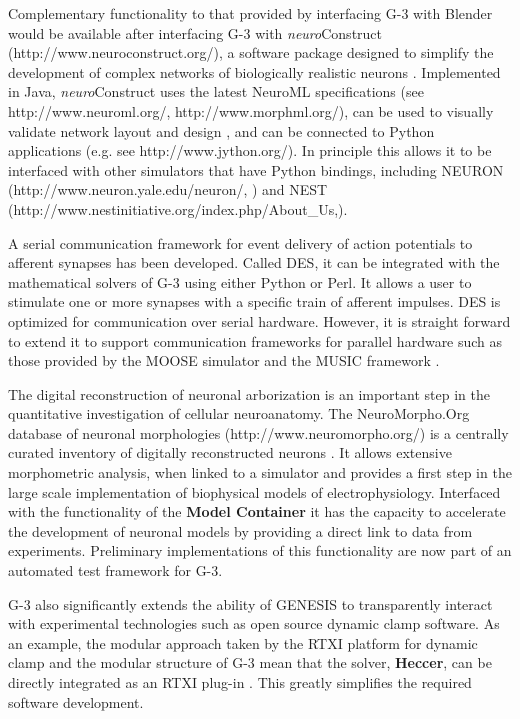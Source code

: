 \documentclass[10pt]{article}
\begin{document}
Complementary functionality to that provided by interfacing G-3 with
Blender would be available after interfacing G-3 with {\it
  neuro}Construct (http://www.neuroconstruct.org/), a software package
designed to simplify the development of complex networks of
biologically realistic neurons \cite{gleeson10:neuroml,
  gleeson07}.  Implemented in Java, {\it neuro}Construct uses the
latest NeuroML specifications (see http://www.neuroml.org/,
http://www.morphml.org/), can be used to visually validate network
layout and design \cite{crook07:_morph}, and can be connected to
Python applications (e.g.  see http://www.jython.org/).  In principle
this allows it to be interfaced with other simulators that have Python
bindings, including NEURON  (http://www.neuron.yale.edu/neuron/, \cite{m93:_neural_system}) and NEST (http://www.nest\-initiative.org/index.php/About\_Us,\cite{diesmann01}).

A serial communication framework for event delivery of action
potentials to afferent synapses has been developed.  Called
DES, it can be integrated
with the mathematical solvers of G-3 using either Python or Perl. It allows a user to stimulate one or more synapses with a specific train of afferent impulses.
DES is optimized for communication over serial hardware. However, it is straight forward
to extend it to support communication frameworks for parallel
hardware such as those provided by the MOOSE
simulator \cite{ray08:_pymoos} and the MUSIC
framework \cite{djurfeldt10:_run_time_inter_between_neuron}.

The digital reconstruction of neuronal arborization is an important step in the
quantitative investigation of cellular neuroanatomy.  The NeuroMorpho.Org database of neuronal morphologies
(http://www.neuromorpho.org/) is a centrally curated inventory of
digitally reconstructed neurons \cite{ascoli06:_mobil}.  It allows
extensive morphometric analysis, when linked to a simulator and provides a first step in the large scale
implementation of biophysical models of electrophysiology.  Interfaced with the functionality of the {\bf Model Container} it has the capacity to
accelerate the development of neuronal models by providing a direct
link to data from experiments.  Preliminary implementations of this
functionality are now part of an automated test framework for G-3.

G-3 also significantly extends the ability of GENESIS to transparently
interact with experimental technologies such as open source dynamic
clamp software.  As an example, the modular approach taken by the RTXI
platform for dynamic
clamp \cite{bettencourt08:_effec_imper_dynam_clamp, dorval01:_real}
and the modular structure of G-3 mean that the solver, {\bf Heccer},
can be directly integrated as an RTXI
plug-in \cite{cornelis10:_realt_rtxi_genes}.  This greatly simplifies
the required software development.
\end{document}

